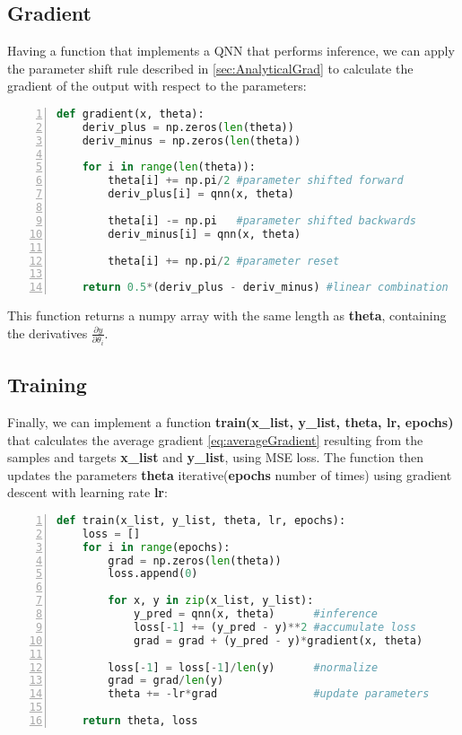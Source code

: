 \subsection{Gradient}\label{sec:GradientImplementation}
Having a function that implements a QNN that performs inference, we can apply the parameter shift rule described in \autoref{sec:AnalyticalGrad} to calculate the gradient of the output with respect to the parameters:

\begin{lstlisting}[language=python, numbers=left]
def gradient(x, theta):
    deriv_plus = np.zeros(len(theta))
    deriv_minus = np.zeros(len(theta))
    
    for i in range(len(theta)):
        theta[i] += np.pi/2 #parameter shifted forward
        deriv_plus[i] = qnn(x, theta) 
        
        theta[i] -= np.pi   #parameter shifted backwards
        deriv_minus[i] = qnn(x, theta)
        
        theta[i] += np.pi/2 #parameter reset
    
    return 0.5*(deriv_plus - deriv_minus) #linear combination
\end{lstlisting}
This function returns a numpy array with the same length as \textbf{theta}, containing the derivatives $\frac{\partial y}{\partial \theta_i}$.

\subsection{Training}\label{sec:QNNTraining}

Finally, we can implement a function \textbf{train(x\_list, y\_list, theta, lr, epochs)} that calculates the average gradient \autoref{eq:averageGradient} resulting from the samples and targets \textbf{x\_list} and \textbf{y\_list}, using MSE loss. The function then updates the parameters \textbf{theta} iterative(\textbf{epochs} number of times) using gradient descent with learning rate \textbf{lr}:

\begin{lstlisting}[language=python, numbers=left]
def train(x_list, y_list, theta, lr, epochs):
    loss = []
    for i in range(epochs):
        grad = np.zeros(len(theta))
        loss.append(0)
        
        for x, y in zip(x_list, y_list):
            y_pred = qnn(x, theta)      #inference
            loss[-1] += (y_pred - y)**2 #accumulate loss        
            grad = grad + (y_pred - y)*gradient(x, theta)
        
        loss[-1] = loss[-1]/len(y)      #normalize
        grad = grad/len(y)
        theta += -lr*grad               #update parameters
    
    return theta, loss
\end{lstlisting}

